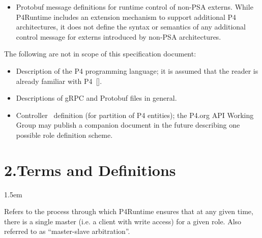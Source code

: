 \documentclass[11pt]{article}
\begin{document}
{\begin{itemize}[noitemsep,topsep=\mdcompacttopsep]
\item{}Protobuf message definitions for runtime control of non-PSA externs. While
P4Runtime includes an extension mechanism to support additional P4
architectures, it does not define the syntax or semantics of any additional
control message for externs introduced by non-PSA architectures.%
\end{itemize}%

\noindent{}The following are not in scope of this specification document:%

\begin{itemize}[noitemsep,topsep=\mdcompacttopsep]%

\item{}Description of the P4 programming language; it is assumed that the reader is
already familiar with P4~[].%

\item{}Descriptions of gRPC and Protobuf files in general.%

\item{}Controller~ definition (for partition of
P4 entities); the P4.org API Working Group may publish a companion document in
the future describing one possible role definition scheme.%
\end{itemize}%

\section{2.\hspace*{0.5em}Terms and Definitions}\label{sec-terms-and-definitions}%

\begin{mddefinitions}%


\begin{mdbmarginx}{}{}{}{1.5em}%
\begin{mddefdata}%
Refers to the process through which P4Runtime ensures that at any given
time, there is a single master (i.e. a client with write access) for a given
role. Also referred to as \textquotedblleft{}master-slave arbitration\textquotedblright{}.
\end{mddefdata}%
\end{mdbmarginx}%


\end{mddefinitions}}
\end{document}
